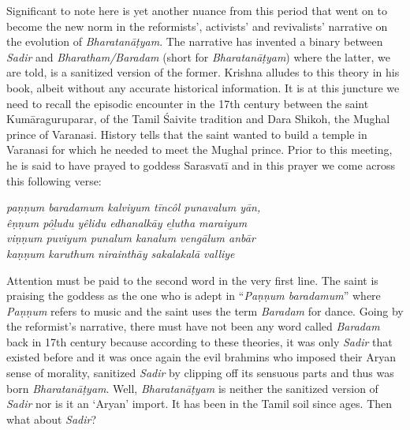 Significant to note here is yet another nuance from this period that went on to become the new norm in the reformists’, activists’ and revivalists’ narrative on the evolution of \textit{Bharatanāṭyam}. The narrative has invented a binary between \textit{Sadir} and \textit{Bharatham/Baradam }(short for\textit{ Bharatanāṭyam}) where the latter, we are told, is a sanitized version of the former. Krishna alludes to this theory in his book, albeit without any accurate historical information. It is at this juncture we need to recall the episodic encounter in the 17th century between the saint Kumāraguruparar, of the Tamil Śaivite tradition and Dara Shikoh, the Mughal prince of Varanasi. History tells that the saint wanted to build a temple in Varanasi for which he needed to meet the Mughal prince. Prior to this meeting, he is said to have prayed to goddess Sarasvatī and in this prayer we come across this following verse:

\begin{myquote}
\textit{paṇṇum baradamum kalviyum tīncôl punavalum yān,}\\\textit{êṇṇum pôḻudu yêlidu edhanalkāy eḻutha maraiyum}\\\textit{viṇṇum puviyum punalum kanalum vengālum anbār}\\\textit{kaṇṇum karuthum nirainthāy sakalakalā valliye}
\end{myquote}

\begin{myquote}
\end{myquote}

Attention must be paid to the second word in the very first line. The saint is praising the goddess as the one who is adept in “\textit{Paṇṇum baradamum}” where \textit{Paṇṇum} refers to music and the saint uses the term \textit{Baradam} for dance. Going by the reformist’s narrative, there must have not been any word called \textit{Baradam} back in 17th century because according to these theories, it was only \textit{Sadir} that existed before and it was once again the evil brahmins who imposed their Aryan sense of morality, sanitized \textit{Sadir} by clipping off its sensuous parts and thus was born \textit{Bharatanāṭyam}. Well, \textit{Bharatanāṭyam} is neither the sanitized version of \textit{Sadir} nor is it an ‘Aryan’ import. It has been in the Tamil soil since ages. Then what about \textit{Sadir}?

